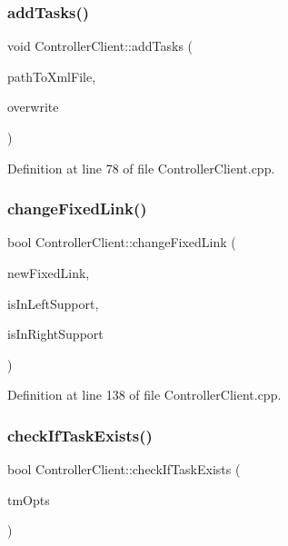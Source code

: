 \subsubsection{\texorpdfstring{add\+Tasks()}{addTasks()}}
{\footnotesize\ttfamily void Controller\+Client\+::add\+Tasks (\begin{DoxyParamCaption}\item[{const std\+::string \&}]{path\+To\+Xml\+File,  }\item[{bool}]{overwrite }\end{DoxyParamCaption})}



Definition at line 78 of file Controller\+Client.\+cpp.

\hypertarget{classocra__recipes_1_1ControllerClient_ac4619242e809fa326f25f073d18feb50}{}\label{classocra__recipes_1_1ControllerClient_ac4619242e809fa326f25f073d18feb50} 
\subsubsection{\texorpdfstring{change\+Fixed\+Link()}{changeFixedLink()}}
{\footnotesize\ttfamily bool Controller\+Client\+::change\+Fixed\+Link (\begin{DoxyParamCaption}\item[{std\+::string}]{new\+Fixed\+Link,  }\item[{int}]{is\+In\+Left\+Support,  }\item[{int}]{is\+In\+Right\+Support }\end{DoxyParamCaption})}



Definition at line 138 of file Controller\+Client.\+cpp.

\hypertarget{classocra__recipes_1_1ControllerClient_aea41250cfe35937fc49f7261b0f356a3}{}\label{classocra__recipes_1_1ControllerClient_aea41250cfe35937fc49f7261b0f356a3} 
\subsubsection{\texorpdfstring{check\+If\+Task\+Exists()}{checkIfTaskExists()}}
{\footnotesize\ttfamily bool Controller\+Client\+::check\+If\+Task\+Exists (\begin{DoxyParamCaption}\item[{\hyperlink{classocra_1_1TaskBuilderOptions}{ocra\+::\+Task\+Builder\+Options} \&}]{tm\+Opts }\end{DoxyParamCaption})}



